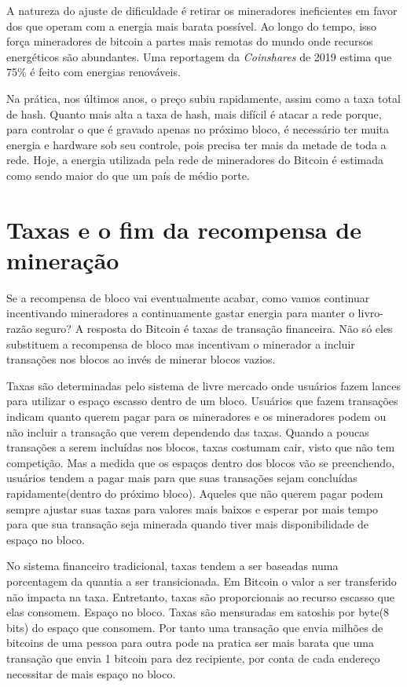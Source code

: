A natureza do ajuste de dificuldade é retirar os mineradores ineficientes em favor dos que operam com a energia mais barata possível. 
Ao longo do tempo, isso força mineradores de bitcoin a partes mais remotas do mundo onde recursos energéticos são abundantes. 
Uma reportagem da \textit{Coinshares} de 2019 estima que 75\% é feito com energias renováveis.

Na prática, nos últimos anos, o preço subiu rapidamente, assim como a taxa total de hash. Quanto mais alta a taxa de hash, mais difícil é atacar a rede porque, para controlar o que é gravado apenas no próximo bloco, é necessário ter muita energia e hardware sob seu controle, pois precisa ter mais da metade de toda a rede. Hoje, a energia utilizada pela rede de mineradores do Bitcoin é estimada como sendo maior do que um país de médio porte.




\section*{Taxas e o fim da recompensa de mineração} 

Se a recompensa de bloco vai eventualmente acabar, como vamos continuar incentivando mineradores a continuamente gastar energia para manter o livro-razão seguro?
A resposta do Bitcoin é taxas de transação financeira.
Não só eles substituem a recompensa de bloco mas incentivam o minerador a incluir transações nos blocos ao invés de minerar blocos vazios.

Taxas são determinadas pelo sistema de livre mercado onde usuários fazem lances para  utilizar o espaço escasso dentro de um bloco. Usuários que fazem transações indicam quanto querem pagar para os mineradores e os mineradores podem ou não incluir a transação que verem dependendo das taxas. 
Quando a poucas transações a serem incluídas nos blocos, taxas costumam cair, visto que não tem competição. Mas a medida que os espaços dentro dos blocos vão se preenchendo, usuários tendem a pagar mais  para que suas transações sejam concluídas rapidamente(dentro do próximo bloco). Aqueles que não querem pagar podem sempre ajustar suas taxas para valores mais baixos e esperar por mais tempo para que sua transação seja minerada quando tiver mais disponibilidade de espaço no bloco.

No sistema financeiro tradicional, taxas tendem a ser baseadas numa porcentagem da quantia a ser transicionada. Em Bitcoin o valor a ser transferido não impacta na taxa. Entretanto, taxas são proporcionais ao recurso escasso que elas consomem. Espaço no bloco. Taxas são mensuradas em satoshis por byte(8 bits) do espaço que consomem. Por tanto uma transação que envia milhões de bitcoins de uma pessoa para outra pode na pratica ser mais barata que uma transação que envia 1 bitcoin para dez recipiente, por conta de cada endereço necessitar de mais espaço no bloco.

